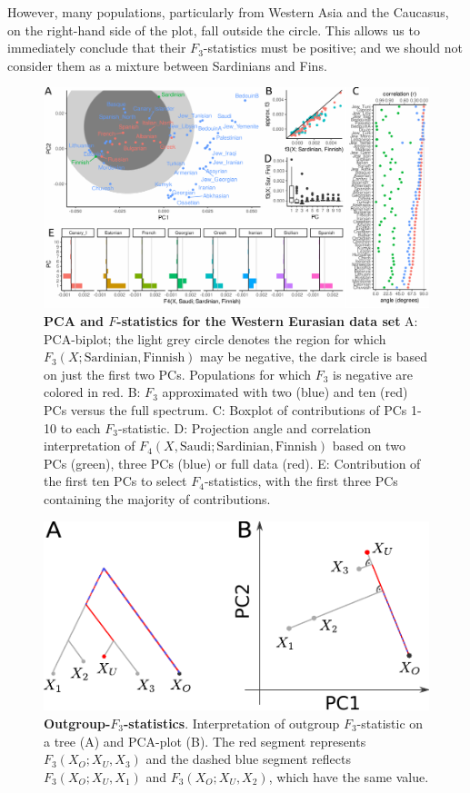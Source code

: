 \documentclass[12pt,fullpage, a4paper]{article}
\begin{document}
However, many populations, particularly from Western Asia and the Caucasus, on the right-hand side of the plot, fall outside the circle. This allows us to immediately conclude that their $F_3$-statistics must be positive; and we should not consider them as a mixture between Sardinians and Fins.


\begin{figure}[!ht]
	\includegraphics[width=\textwidth]{figures/fig_data_europe.pdf}
	\caption{\textbf{PCA and $F$-statistics for the Western Eurasian data set} A: PCA-biplot; the light grey circle denotes the region for which $F_3(X; \text{Sardinian}, \text{Finnish})$ may be negative, the dark circle is based on just the first two PCs. Populations for which $F_3$ is negative are colored in red. B: $F_3$ approximated with two (blue) and ten (red) PCs versus the full spectrum. C: Boxplot of contributions of PCs 1-10 to each $F_3$-statistic. D: Projection angle and correlation interpretation of $F_4(X, \text{Saudi}; \text{Sardinian}, \text{Finnish})$ based on two PCs (green), three PCs (blue) or full data (red). E: Contribution of the first ten PCs to select $F_4$-statistics, with the first three PCs containing the majority of contributions.}
	\label{fig:f3}
\end{figure}


\begin{figure}[!ht]
	\includegraphics[width=.8\textwidth]{figures/outgroup_f3.pdf}
	\caption{\textbf{Outgroup-$F_3$-statistics}. Interpretation of outgroup $F_3$-statistic on a tree (A) and PCA-plot (B).  The red segment represents $F_3(X_O; X_U, X_3)$ and the dashed blue segment reflects $F_3(X_O; X_U, X_1)$ and $F_3(X_O; X_U, X_2)$, which have the same value. 
	}
	\label{fig:outgroupf3}
\end{figure}
\end{document}
